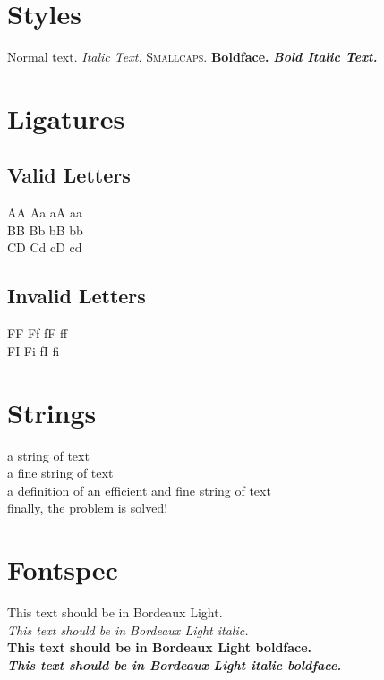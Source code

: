 \documentclass[12pt]{article}
\begin{document}
\section{Styles}
Normal text.  \textit{Italic Text.}  \textsc{Smallcaps.}  \textbf{Boldface.}  \textit{\textbf{Bold Italic Text.}}

\section{Ligatures}
\subsection{Valid Letters}
AA Aa aA aa\\
BB Bb bB bb\\
CD Cd cD cd\\
\subsection{Invalid Letters}
FF Ff fF ff\\
FI Fi fI fi\\

\section{Strings}
a string of text\\
a fine string of text\\
a definition of an efficient and fine string of text\\
finally, the problem is solved!\\

\section{Fontspec}
{\bordeauxfont This text should be in Bordeaux Light.}\\
{\bordeauxfont \textit{This text should be in Bordeaux Light italic.}}\\
{\bordeauxfont \textbf{This text should be in Bordeaux Light boldface.}}\\
{\bordeauxfont \textbf{\textit{This text should be in Bordeaux Light italic boldface.}}}
\end{document}
